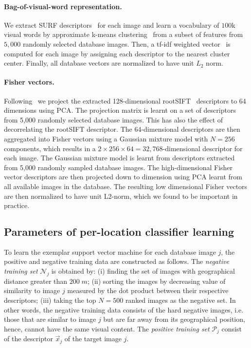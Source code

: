       \paragraph{Bag-of-visual-word representation.}
         We extract SURF descriptors~\cite{Bay06} for each image and learn a vocabulary of $100$k visual words by approximate k-means clustering~\cite{Philbin07} from a subset of features from $5,000$ randomly selected database images. Then, a tf-idf weighted vector~\cite{Sivic03} is computed for each image by assigning each descriptor to the nearest cluster center.  Finally, all database vectors are normalized to have unit $L_2$ norm.
        
      \paragraph{Fisher vectors.}
        Following~\cite{Jegou12} we project the extracted 128-dimensional rootSIFT~\cite{Arandjelovic12} descriptors to 64 dimensions using PCA. The projection matrix is learnt on a set of descriptors from 5,000 randomly selected database images. This has also the effect of decorrelating the rootSIFT descriptor. The 64-dimensional descriptors are then aggregated into Fisher vectors using a Gaussian mixture model with $N=256$ components, which results in a $2\times256\times64 = 32,768$-dimensional descriptor for each image.  
        The Gaussian mixture model is learnt from descriptors extracted from 5,000 randomly sampled database images. The  high-dimensional Fisher vector descriptors are then projected down to dimension using PCA learnt from all available images in the database. The resulting low dimensional Fisher vectors are then normalized to have unit L2-norm, which we found to be important in practice.
      
    \subsection{Parameters of per-location classifier learning}
    \label{sub:paramsOfPerLoc}
      To learn the exemplar support vector machine for each database image $j$, the positive and negative training data are constructed as follows. 
      The \emph{negative training set} $\mathcal N_j$ is obtained by: (i) finding the set of images with geographical distance greater than $200\;m$; (ii)  sorting the images by decreasing value of similarity to image $j$ measured by the dot product between their respective descriptors; (iii) taking the top $N=500$ ranked images as the negative set. 
      In other words, the negative training data consists of the hard negative images, i.e. those that are similar to image $j$ but are far away from its geographical position, hence, cannot have the same visual content. 
      The \emph{positive training set} $\mathcal P_j$ consist of the descriptor $\vec{x}_j$ of the target image $j$. 
      
